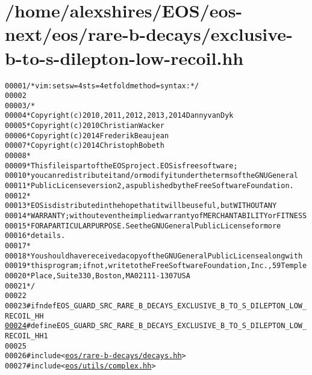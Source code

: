 \hypertarget{exclusive-b-to-s-dilepton-low-recoil_8hh_source}{
\section{/home/alexshires/EOS/eos-\/next/eos/rare-\/b-\/decays/exclusive-\/b-\/to-\/s-\/dilepton-\/low-\/recoil.hh}
}


\begin{footnotesize}\begin{alltt}
00001 \textcolor{comment}{/* vim: set sw=4 sts=4 et foldmethod=syntax : */}
00002 
00003 \textcolor{comment}{/*}
00004 \textcolor{comment}{ * Copyright (c) 2010, 2011, 2012, 2013, 2014 Danny van Dyk}
00005 \textcolor{comment}{ * Copyright (c) 2010 Christian Wacker}
00006 \textcolor{comment}{ * Copyright (c) 2014 Frederik Beaujean}
00007 \textcolor{comment}{ * Copyright (c) 2014 Christoph Bobeth}
00008 \textcolor{comment}{ *}
00009 \textcolor{comment}{ * This file is part of the EOS project. EOS is free software;}
00010 \textcolor{comment}{ * you can redistribute it and/or modify it under the terms of the GNU General}
00011 \textcolor{comment}{ * Public License version 2, as published by the Free Software Foundation.}
00012 \textcolor{comment}{ *}
00013 \textcolor{comment}{ * EOS is distributed in the hope that it will be useful, but WITHOUT ANY}
00014 \textcolor{comment}{ * WARRANTY; without even the implied warranty of MERCHANTABILITY or FITNESS}
00015 \textcolor{comment}{ * FOR A PARTICULAR PURPOSE.  See the GNU General Public License for more}
00016 \textcolor{comment}{ * details.}
00017 \textcolor{comment}{ *}
00018 \textcolor{comment}{ * You should have received a copy of the GNU General Public License along with}
00019 \textcolor{comment}{ * this program; if not, write to the Free Software Foundation, Inc., 59 Temple}
00020 \textcolor{comment}{ * Place, Suite 330, Boston, MA  02111-1307  USA}
00021 \textcolor{comment}{ */}
00022 
00023 \textcolor{preprocessor}{#ifndef EOS\_GUARD\_SRC\_RARE\_B\_DECAYS\_EXCLUSIVE\_B\_TO\_S\_DILEPTON\_LOW\_RECOIL\_HH}
\hypertarget{exclusive-b-to-s-dilepton-low-recoil_8hh_source_l00024}{}\hyperlink{exclusive-b-to-s-dilepton-low-recoil_8hh_a78b6a8ae7b908ace2726ac898a492cdb}{00024} \textcolor{preprocessor}{}\textcolor{preprocessor}{#define EOS\_GUARD\_SRC\_RARE\_B\_DECAYS\_EXCLUSIVE\_B\_TO\_S\_DILEPTON\_LOW\_RECOIL\_HH 1}
00025 \textcolor{preprocessor}{}
00026 \textcolor{preprocessor}{#include <\hyperlink{decays_8hh}{eos/rare-b-decays/decays.hh}>}
00027 \textcolor{preprocessor}{#include <\hyperlink{complex_8hh}{eos/utils/complex.hh}>}

\end{alltt}
\end{footnotesize}
